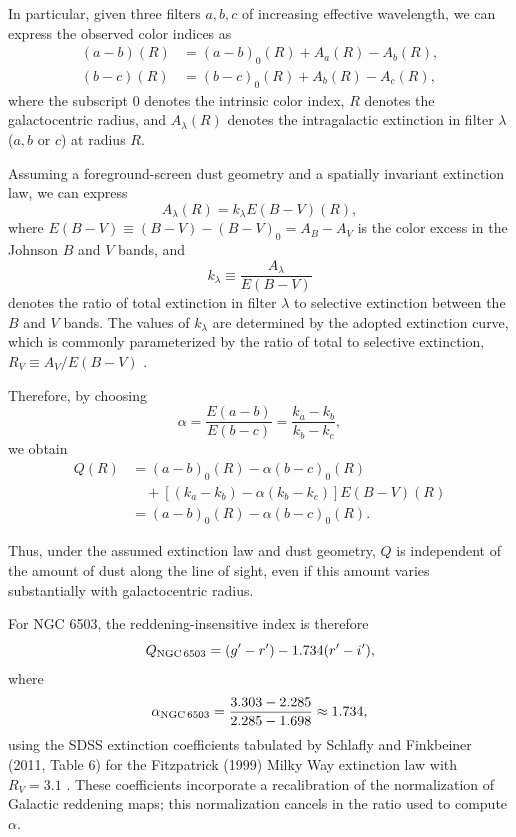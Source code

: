 In particular, given three filters $a,b,c$ of increasing effective wavelength, we can express the observed color indices as
\begin{align}
    (a-b)(R) &= (a-b)_0(R) + A_a(R) - A_b(R),\\
    (b-c)(R) &= (b-c)_0(R) + A_b(R) - A_c(R),
\end{align}
where the subscript $0$ denotes the intrinsic color index, $R$ denotes the galactocentric radius, and $A_\lambda(R)$ denotes the intragalactic extinction in filter $\lambda$ ($a,b$ or $c$) at radius $R$.

Assuming a foreground-screen dust geometry and a spatially invariant extinction law, we can express
\begin{equation}
    A_\lambda(R) = k_\lambda E(B-V)(R),
\end{equation}
where $E(B-V) \equiv (B-V)-(B-V)_0 = A_B-A_V$ is the color excess in the Johnson $B$ and $V$ bands, and
\begin{equation}
    k_\lambda \equiv \frac{A_\lambda}{E(B-V)}
\end{equation}
denotes the ratio of total extinction in filter $\lambda$ to selective extinction between the $B$ and $V$ bands. The values of $k_\lambda$ are determined by the adopted extinction curve, which is commonly parameterized by the ratio of total to selective extinction, $R_V \equiv A_V/E(B-V)$ \cite{Fitzpatrick1999,Schlafly2011}.

Therefore, by choosing
\begin{equation}
    \alpha = \frac{E(a-b)}{E(b-c)}
    = \frac{k_a-k_b}{k_b-k_c},
\end{equation}
we obtain
\begin{align}
    Q(R) &= (a-b)_0(R) - \alpha(b-c)_0(R)\\
    &\quad + \left[(k_a-k_b)-\alpha(k_b-k_c)\right]E(B-V)(R)\\
    &= (a-b)_0(R) - \alpha(b-c)_0(R).
\end{align}

Thus, under the assumed extinction law and dust geometry, $Q$ is independent of the amount of dust along the line of sight, even if this amount varies substantially with galactocentric radius.

For NGC 6503, the reddening-insensitive index is therefore
\begin{equation}
    Q_{\rm NGC\,6503} = (g'-r') - 1.734(r'-i'),
\end{equation}
where
\begin{equation}
    \alpha_{\rm NGC\,6503}
    = \frac{3.303-2.285}{2.285-1.698}
    \approx 1.734,
\end{equation}
using the SDSS extinction coefficients tabulated by Schlafly and Finkbeiner (2011, Table 6) for the Fitzpatrick (1999) Milky Way extinction law with $R_V=3.1$ \cite{Fitzpatrick1999,Schlafly2011}. These coefficients incorporate a recalibration of the normalization of Galactic reddening maps; this normalization cancels in the ratio used to compute $\alpha$.

